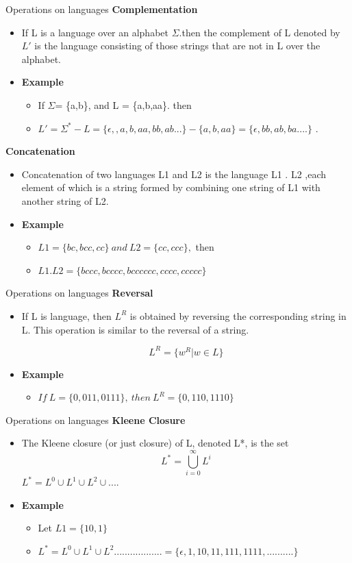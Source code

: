 \documentclass{beamer}
\begin{document}
\begin{frame}{Operations on languages}
	\textbf{Complementation}
	\begin{itemize}
		\item  If L is a language over an alphabet $\Sigma$.then the complement of L denoted by $L'$ is the language consisting of those strings that are not in L over the 
		alphabet.

		\item \textbf{Example}
		\begin{itemize}
			\item If $\Sigma$= \{a,b\}, and L = \{a,b,aa\}.  then 
			\item $L' = \Sigma^*-L = \{\epsilon, ,a,b,aa,bb,ab...\}- \{a,b,aa\}= \{\epsilon ,bb,ab,ba....\}$
			.
		\end{itemize}
	\end{itemize}
	\textbf{Concatenation}
	\begin{itemize}
		\item  Concatenation of two languages L1 and L2 is the language L1 . L2 ,each 
		element of which is a string formed by combining one string of L1 with 
		another string of L2.
		\item \textbf{Example}
		\begin{itemize}
			\item $L1=\{bc,bcc,cc\} \ and \ L2=\{cc,ccc\},$ then 
			\item $L1.L2 =			\{bccc,bcccc,bcccccc,cccc,ccccc\}$
		\end{itemize}
	\end{itemize}
\end{frame}
\begin{frame}{Operations on languages}
	\textbf{Reversal}
	\begin{itemize}
		\item  If L is language, then $L^R$ is obtained by reversing the corresponding 
		string in L. This operation is similar to the reversal of a string.

		$$L^R =\{w^R | w \in L\}$$
		\item \textbf{Example}
		\begin{itemize}
			\item $If\  L= \{0, 011, 0111\},\  then \ L^R 
			= \{0, 110, 1110\}$

		\end{itemize}
	\end{itemize}
\end{frame}
\begin{frame}{Operations on languages}
	\textbf{Kleene Closure}
	\begin{itemize}
		\item The Kleene closure (or just closure) of L, denoted L*, is the set
		$$L^*=\bigcup\limits_{i=0}^{\infty} L^i$$
		$L^*=L^0\cup L^1 \cup L^2 \cup ....$
		\item \textbf{Example}
		\begin{itemize}
			\item Let $L1 = \{10,1\}$ 
			\item $L^* = L^0 \cup L^1 \cup L^2.................. = \{\epsilon, 1, 10, 11, 111, 1111 ,..........\}$
		\end{itemize}
	\end{itemize}
\end{frame}
\end{document}
